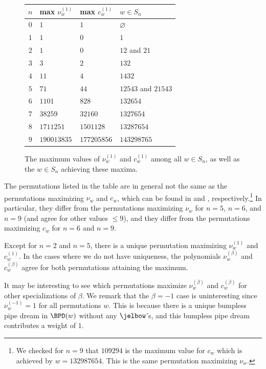 \begin{figure}
    \centering
    \begin{tabular}{|c|l|l|l|}
        \hline
        $n$ & max $\nu^{(1)}_w$ & max $c^{(1)}_w$ & $w\in S_n$ \\
        \hline
        $0$ & $1$ & $1$ & $\varnothing$ \\
        $1$ & $1$ & $0$ & $1$ \\
        $2$ & $1$ & $0$ & $12$ and $21$ \\
        $3$ & $3$ & $2$ & $132$ \\
        $4$ & $11$ & $4$ & $1432$ \\
        $5$ & $71$ & $44$ & $12543$ and $21543$ \\
        $6$ & $1101$ & $828$ & $132654$ \\
        $7$ & $38259$ & $32160$ & $1327654$ \\
        $8$ & $1711251$ & $1501128$ & $13287654$ \\
        $9$ & $190013835$ & $177205856$ & $143298765$ \\
        \hline
    \end{tabular}
    \caption{The maximum values of $\nu^{(1)}_w$ and $c^{(1)}_w$ among all $w\in S_n$, as well as the $w\in S_n$ achieving these maxima.}
    \label{fig:max}
\end{figure}

The permutations listed in the table are in general not the same as the permutations maximizing $\nu_w$ and $c_w$, which can be found in \cite{Sta17} and \cite{Gao21}, respectively.\footnote{
    We checked for $n=9$ that $109294$ is the maximum value for $c_w$ which is achieved by $w = 132987654$.
    This is the same permutation maximizing $\nu_w$.
}
In particular, they differ from the permutations maximizing $\nu_w$ for $n=5$, $n=6$, and $n=9$ (and agree for other values $\leq 9$), and they differ from the permutations maximizing $c_w$ for $n=6$ and $n=9$.

Except for $n=2$ and $n=5$, there is a unique permutation maximizing $\nu^{(1)}_w$ and $c^{(1)}_w$.
In the cases where we do not have uniqueness, the polynomials $\nu^{(\beta)}_w$ and $c^{(\beta)}_w$ agree for both permutations attaining the maximum.

It may be interesting to see which permutations maximize $\nu^{(\beta)}_w$ and $c^{(\beta)}_w$ for other specializations of $\beta$.
We remark that the $\beta=-1$ case is uninteresting since $\nu^{(-1)}_w = 1$ for all permutations $w$.
This is because there is a unique bumpless pipe dream in $\BPD(w)$ without any $\jelbow$'s, and this bumpless pipe dream contributes a weight of $1$.




